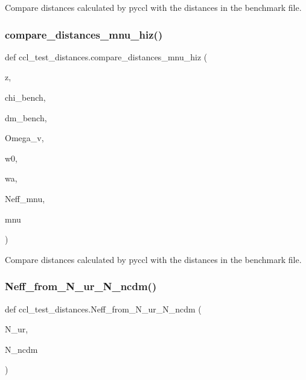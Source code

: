 \begin{DoxyVerb}Compare distances calculated by pyccl with the distances in the benchmark
file.
\end{DoxyVerb}
 \mbox{\label{namespaceccl__test__distances_a31ef9701c1a38e122ac4d470345c8758}} 
\subsubsection{\texorpdfstring{compare\+\_\+distances\+\_\+mnu\+\_\+hiz()}{compare\_distances\_mnu\_hiz()}}
{\footnotesize\ttfamily def ccl\+\_\+test\+\_\+distances.\+compare\+\_\+distances\+\_\+mnu\+\_\+hiz (\begin{DoxyParamCaption}\item[{}]{z,  }\item[{}]{chi\+\_\+bench,  }\item[{}]{dm\+\_\+bench,  }\item[{}]{Omega\+\_\+v,  }\item[{}]{w0,  }\item[{}]{wa,  }\item[{}]{Neff\+\_\+mnu,  }\item[{}]{mnu }\end{DoxyParamCaption})}

\begin{DoxyVerb}Compare distances calculated by pyccl with the distances in the benchmark
file.
\end{DoxyVerb}
 \mbox{\label{namespaceccl__test__distances_a0da11106f7f601d1ac8c71852fb35270}} 
\subsubsection{\texorpdfstring{Neff\+\_\+from\+\_\+\+N\+\_\+ur\+\_\+\+N\+\_\+ncdm()}{Neff\_from\_N\_ur\_N\_ncdm()}}
{\footnotesize\ttfamily def ccl\+\_\+test\+\_\+distances.\+Neff\+\_\+from\+\_\+\+N\+\_\+ur\+\_\+\+N\+\_\+ncdm (\begin{DoxyParamCaption}\item[{}]{N\+\_\+ur,  }\item[{}]{N\+\_\+ncdm }\end{DoxyParamCaption})}

